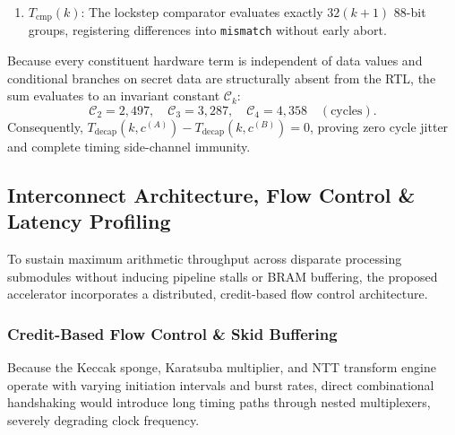 \begin{IEEEproof}
\begin{enumerate}
    \item $T_{\text{cmp}}(k)$: The lockstep comparator evaluates exactly $32(k+1)$ 88-bit groups, registering differences into \texttt{mismatch} without early abort.
\end{enumerate}
Because every constituent hardware term is independent of data values and conditional branches on secret data are structurally absent from the RTL, the sum evaluates to an invariant constant $\mathcal{C}_k$:
\begin{equation}
\label{eq:exact_latencies}
\mathcal{C}_2 = 2,497, \quad \mathcal{C}_3 = 3,287, \quad \mathcal{C}_4 = 4,358 \quad (\text{cycles}).
\end{equation}
Consequently, $T_{\text{decap}}(k, c^{(A)}) - T_{\text{decap}}(k, c^{(B)}) = 0$, proving zero cycle jitter and complete timing side-channel immunity.
\end{IEEEproof}

\subsection{Interconnect Architecture, Flow Control \& Latency Profiling}
\label{sec:arch_latency}

To sustain maximum arithmetic throughput across disparate processing submodules without inducing pipeline stalls or BRAM buffering, the proposed accelerator incorporates a distributed, credit-based flow control architecture.

\subsubsection{Credit-Based Flow Control \& Skid Buffering}
Because the Keccak sponge, Karatsuba multiplier, and NTT transform engine operate with varying initiation intervals and burst rates, direct combinational handshaking would introduce long timing paths through nested multiplexers, severely degrading clock frequency.

